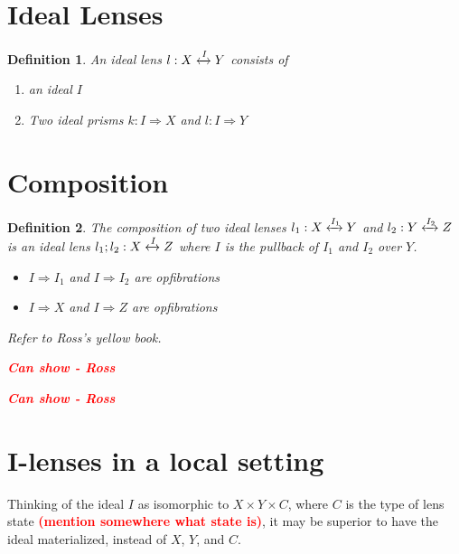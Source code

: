 \documentclass[a4paper,10pt]{article}
\newtheorem{definition}{Definition}
\newcommand{\finish}[1]{#1}
\newcommand{\comment}[1]{\finish{\textbf{\textcolor{red}{#1}}}}
\begin{document}
\section{Ideal Lenses}
\begin{definition}
 An ideal lens $l : X \xleftrightarrow{I} Y$ consists of 
 \begin{enumerate}
  \item an ideal $I$ 
  \item Two ideal prisms $k : I \Rightarrow X$ and $l : I \Rightarrow Y$
\end{enumerate}
\end{definition}

\section{Composition}
\begin{definition}
The composition of two ideal lenses $l_1: X \xleftrightarrow{I_1} Y$
and $l_2: Y \xleftrightarrow{I_2} Z$ is an ideal lens $l_1;l_2: X
\xleftrightarrow{I} Z$ where $I$ is the pullback of $I_1$ and $I_2$
over $Y$.

\begin{itemize}
 \item $I \Rightarrow I_1$ and $I \Rightarrow I_2$ are
  opfibrations
 \item $I \Rightarrow X$ and $I \Rightarrow Z$ are
  opfibrations 
\end{itemize}
  Refer to Ross's yellow book.

\comment{Can show  - Ross}

\comment{Can show - Ross}

\end{definition}


\section{I-lenses in a local setting}
  Thinking of the ideal $I$ as isomorphic to $X \times Y \times C$,
  where $C$ is the type of lens state \comment{(mention somewhere what
    state is)}, it may be superior to have the ideal materialized, instead of $X$, $Y$, and $C$. 
\end{document}
